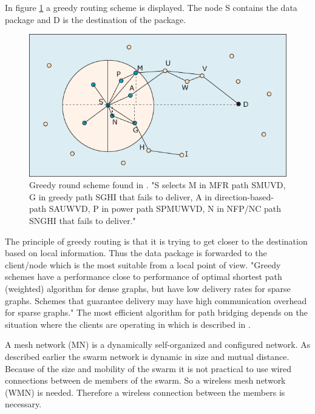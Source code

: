 \documentclass[10pt,a4paper]{article}
\begin{document}
In figure \ref{fig:greedyrouting} a greedy routing scheme is displayed. The node S contains the data package and D is the destination of the package. 

\begin{figure}[H]
   \centering
   \includegraphics[width=1\textwidth]{greedyrouting}
   \caption{Greedy round scheme found in \cite{position-based}. "S selects M in MFR path SMUVD, G in greedy path SGHI that
fails to deliver, A in direction-based-path SAUWVD, P in power path
SPMUWVD, N in NFP/NC path SNGHI that fails to deliver."}
   \label{fig:greedyrouting}
\end{figure}

The principle of greedy routing is that it is trying to get closer to the destination based on local information. Thus the data package is forwarded to the client/node which is the most suitable from a local point of view. \cite{geographicrouting} "Greedy schemes have a performance close to performance of optimal shortest path (weighted) algorithm for dense graphs, but have low delivery rates for sparse graphs. Schemes that guarantee delivery may have high communication overhead for sparse graphs." \cite{position-based} The most efficient algorithm for path bridging depends on the situation where the clients are operating in which is described in \cite{position-based}.



A mesh network (MN) is a dynamically self-organized and configured network. \cite{WMN1} As described earlier the swarm network is dynamic in size and mutual distance. Because of the size and mobility of the swarm it is not practical to use wired connections between de members of the swarm. So a wireless mesh network (WMN) is needed. Therefore a wireless connection between the members is necessary.
\end{document}
